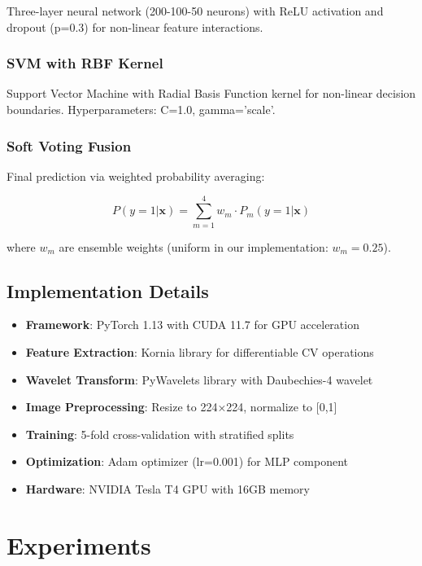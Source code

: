 \documentclass[runningheads]{llncs}
\begin{document}
Three-layer neural network (200-100-50 neurons) with ReLU activation and dropout (p=0.3) for non-linear feature interactions.

\subsubsection{SVM with RBF Kernel}

Support Vector Machine with Radial Basis Function kernel for non-linear decision boundaries. Hyperparameters: C=1.0, gamma='scale'.

\subsubsection{Soft Voting Fusion}

Final prediction via weighted probability averaging:

\begin{equation}
    P(y=1|\mathbf{x}) = \sum_{m=1}^{4} w_m \cdot P_m(y=1|\mathbf{x})
\end{equation}

where $w_m$ are ensemble weights (uniform in our implementation: $w_m = 0.25$).

\subsection{Implementation Details}

\begin{itemize}
    \item \textbf{Framework}: PyTorch 1.13 with CUDA 11.7 for GPU acceleration
    \item \textbf{Feature Extraction}: Kornia library for differentiable CV operations
    \item \textbf{Wavelet Transform}: PyWavelets library with Daubechies-4 wavelet
    \item \textbf{Image Preprocessing}: Resize to 224×224, normalize to [0,1]
    \item \textbf{Training}: 5-fold cross-validation with stratified splits
    \item \textbf{Optimization}: Adam optimizer (lr=0.001) for MLP component
    \item \textbf{Hardware}: NVIDIA Tesla T4 GPU with 16GB memory
\end{itemize}

\section{Experiments}
\label{sec:experiments}
\end{document}
